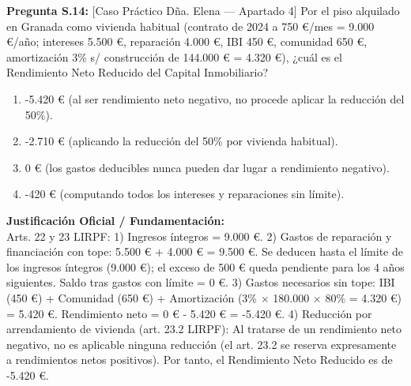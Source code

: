 \documentclass[11pt,a4paper,openany]{article}
\begin{document}
\noindent\textbf{\sffamily Pregunta S.14:} [Caso Práctico Dña. Elena — Apartado 4] Por el piso alquilado en Granada como vivienda habitual (contrato de 2024 a 750 \euro{}/mes = 9.000 \euro{}/año; intereses 5.500 \euro{}, reparación 4.000 \euro{}, IBI 450 \euro{}, comunidad 650 \euro{}, amortización 3\% s/ construcción de 144.000 \euro{} = 4.320 \euro{}), ¿cuál es el Rendimiento Neto Reducido del Capital Inmobiliario?\\[0.15cm]
\begin{enumerate}[label=\textbf{\alph*)},leftmargin=1.8em,itemsep=1.5pt,topsep=2pt,partopsep=0pt,parsep=0pt]
    \item -5.420 \euro{} (al ser rendimiento neto negativo, no procede aplicar la reducción del 50\%).
    \item -2.710 \euro{} (aplicando la reducción del 50\% por vivienda habitual).
    \item 0 \euro{} (los gastos deducibles nunca pueden dar lugar a rendimiento negativo).
    \item -420 \euro{} (computando todos los intereses y reparaciones sin límite).
\end{enumerate}
\begin{solucionBox}
\textbf{Justificación Oficial / Fundamentación:}\\[0.1cm]
Arts. 22 y 23 LIRPF: 1) Ingresos íntegros = 9.000 \euro{}. 2) Gastos de reparación y financiación con tope: 5.500 \euro{} + 4.000 \euro{} = 9.500 \euro{}. Se deducen hasta el límite de los ingresos íntegros (9.000 \euro{}); el exceso de 500 \euro{} queda pendiente para los 4 años siguientes. Saldo tras gastos con límite = 0 \euro{}. 3) Gastos necesarios sin tope: IBI (450 \euro{}) + Comunidad (650 \euro{}) + Amortización (3\% $\times$  180.000 $\times$  80\% = 4.320 \euro{}) = 5.420 \euro{}. Rendimiento neto = 0 \euro{} - 5.420 \euro{} = -5.420 \euro{}. 4) Reducción por arrendamiento de vivienda (art. 23.2 LIRPF): Al tratarse de un rendimiento neto negativo, no es aplicable ninguna reducción (el art. 23.2 se reserva expresamente a rendimientos netos positivos). Por tanto, el Rendimiento Neto Reducido es de -5.420 \euro{}.
\end{solucionBox}
\vspace{0.35cm}
\end{document}

